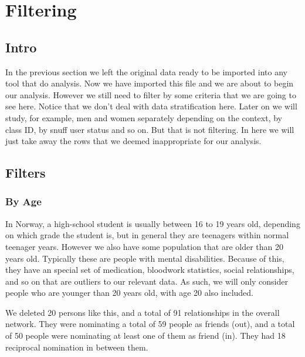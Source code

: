 \chapter{Filtering}\label{ch:filtering}

\section{Intro}

In the previous section we left the original data ready to be imported into any tool that do analysis. Now we have imported this file and we are about to begin our analysis. However we still need to filter by some criteria that we are going to see here. Notice that we don't deal with data stratification here. Later on we will study, for example, men and women separately depending on the context, by class ID, by snuff user status and so on. But that is not filtering. In here we will just take away the rows that we deemed inappropriate for our analysis.\vspace{3 mm}

\section{Filters}

\subsection{By Age}

In Norway, a high-school student is usually between 16 to 19 years old, depending on which grade the student is, but in general they are teenagers within normal teenager years. However we also have some population that are older than 20 years old. Typically these are people with mental disabilities. Because of this, they have an special set of medication, bloodwork statistics, social relationships, and so on that are outliers to our relevant data. As such, we will only consider people who are younger than 20 years old, with age 20 also included.\vspace{3 mm}

We deleted 20 persons like this, and a total of 91 relationships in the overall network. They were nominating a total of 59 people as friends (out), and a total of 50 people were nominating at least one of them as friend (in). They had 18 reciprocal nomination in between them.\vspace{3 mm}

